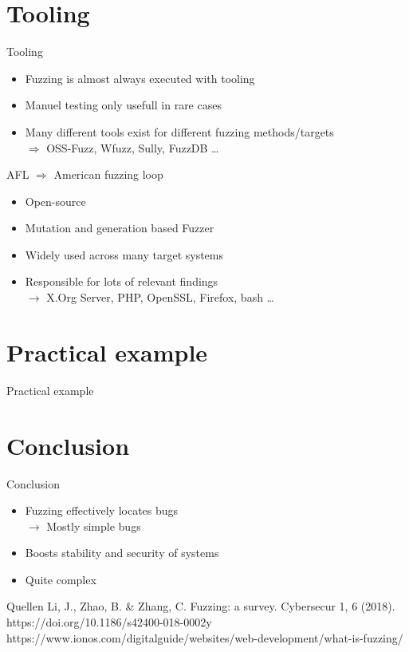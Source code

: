 \documentclass{beamer}
\begin{document}
\section{Tooling}
\begin{frame}{Tooling}
 \begin{itemize}
  \item Fuzzing is almost always executed with tooling
  \item Manuel testing only usefull in rare cases
  \item Many different tools exist for different fuzzing methods/targets\\
  $\Rightarrow$ OSS-Fuzz, Wfuzz, Sully, FuzzDB \dots
 \end{itemize}

\end{frame}
\begin{frame}{AFL}
 $\Rightarrow$ American fuzzing loop
 \begin{itemize}
 \item Open-source
  \item Mutation and generation based Fuzzer
  \item Widely used across many target systems
  \item Responsible for lots of relevant findings\\
  $\rightarrow$ X.Org Server, PHP, OpenSSL, Firefox, bash \dots
 \end{itemize}

\end{frame}

\section{Practical example}

\begin{frame}{Practical example}
 
\end{frame}
\section{Conclusion}
\begin{frame}{Conclusion}
 \begin{itemize}
 \item Fuzzing effectively locates bugs\\
 $\rightarrow$ Mostly simple bugs
 \item Boosts stability and security of systems
  \item Quite complex
 \end{itemize}

\end{frame}
\begin{frame}{Quellen}
Li, J., Zhao, B. \& Zhang, C. Fuzzing: a survey. Cybersecur 1, 6 (2018). https://doi.org/10.1186/s42400-018-0002\-y\\
https://www.ionos.com/digitalguide/websites/web-development/what-is-fuzzing/

\end{frame}
\end{document}
